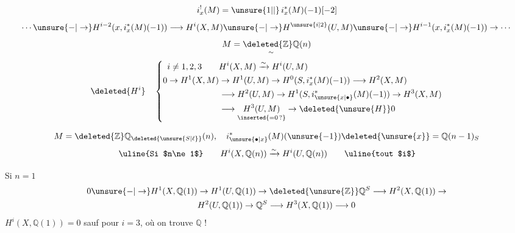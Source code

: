 \[
i_x^!(M)=\unsure{1|\vert}\,i_x^*(M)(-1)[-2]
\]
\[
\cdots\unsure{-|\to}H^{i-2}(x,i_x^*(M)(-1))\longrightarrow H^i(X,M)\unsure{-|\to}H^{\unsure{i|2}}(U,M)\unsure{-|\to}H^{i-1}(x,i_x^*(M)(-1))\to\cdots
\]
\[
M=\underset{\sim}{\deleted{\mathbb{Z}}\mathbb{Q}}(n)
\]
\[
\deleted{H^i}\quad
\left\{\begin{aligned}
i\ne1,2,3\qquad&H^i(X,M)\xrightarrow{\sim}H^i(U,M)\\
0\to H^1(X,M)&\to H^1(U,M)\to H^0(S,i_x^*(M)(-1))\longrightarrow H^2(X,M)\\
&\longrightarrow H^2(U,M)\to H^1(S,i_{\unsure{x|\bullet}}^*(M)(-1))\to H^3(X,M)\\
&\longrightarrow\underset{\inserted{=0\,?}}{H^3(U,M)}\to\deleted{\unsure{H}}0
\end{aligned}\right.
\]

\[
M=\deleted{\mathbb{Z}}\mathbb{Q}_{\deleted{\unsure{S|\ell}}}(n),\quad i_{\unsure{\bullet|x}}^*(M)(\unsure{-1})\deleted{\unsure{x}}=\mathbb{Q}(n-1)_S
\]
\[
\text{\uline{Si $n\ne1$}}\qquad H^i(X,\mathbb{Q}(n))\xrightarrow{\sim}H^i(U,\mathbb{Q}(n))\qquad\text{\uline{tout $i$}}
\]

Si $n=1$
\[
\begin{aligned}
0\unsure{-|\to}H^1(X,\mathbb{Q}(1))&\to H^1(U,\mathbb{Q}(1))\to\deleted{\unsure{\mathbb{Z}}}\mathbb{Q}^S\longrightarrow H^2(X,\mathbb{Q}(1))\to\\
&H^2(U,\mathbb{Q}(1))\to\mathbb{Q}^S\longrightarrow H^3(X,\mathbb{Q}(1))\longrightarrow0
\end{aligned}
\]
$H^i(X,\mathbb{Q}(1))=0$ sauf pour $i=3$, où on trouve $\mathbb{Q}$ !


